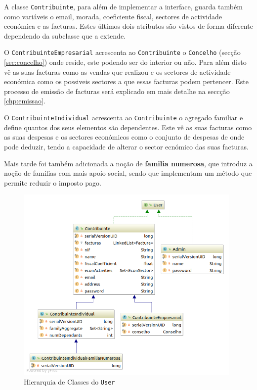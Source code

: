 \documentclass[12pt,a4paper]{report}
\begin{document}
    A classe \texttt{Contribuinte}, para além de implementar a interface,
    guarda também como variáveis o email, morada, coeficiente fiscal, sectores
    de actividade económica e as facturas. Estes últimos dois atributos são
    vistos de forma diferente dependendo da subclasse que a extende.

    O \texttt{ContribuinteEmpresarial} acrescenta ao
    \texttt{Contribuinte} o \texttt{Concelho} (secção
    \ref{sec:concelho}) onde reside, este podendo ser do interior ou não. Para além
    disto vê as suas facturas como as vendas que realizou e os sectores de
    actividade económica como os possiveis sectores a que essas facturas podem
    pertencer. Este processo de emissão de facturas será explicado em mais detalhe
    na seccção \ref{chp:emissao}.

    O \texttt{ContribuinteIndividual} acrescenta ao
    \texttt{Contribuinte} o agregado familiar e define quantos dos seus
    elementos são dependentes. Este vê as suas facturas como as suas despesas e os
    sectores económicos como o conjunto de despesas de onde pode deduzir, tendo a
    capacidade de alterar o sector ecnómico das suas facturas.

    Mais tarde foi também adicionada a noção de \textbf{familia numerosa}, que
    introduz a noção de famílias com mais apoio social, sendo que implementam um
    método que permite reduzir o imposto pago.

    \begin{figure}[H]
        \centering
        \includegraphics[width=11cm]{./images/UserHierarquy.png}
        \caption{Hierarquia de Classes do \texttt{User}}
        \label{fig:Hierarquia}
    \end{figure}
\end{document}
